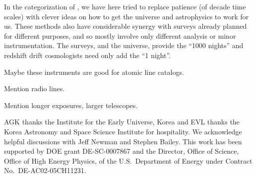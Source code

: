 \documentclass[preprint2, 10pt]{aastex}
\begin{document}
In the categorization of \citet{stebbins}, we have here tried to replace 
patience (of decade time scales) with clever ideas on how to get the 
universe and astrophysics to work for us.  These methods also have 
considerable synergy with surveys already planned for different purposes, 
and so mostly involve only different analysis or minor instrumentation. 
The surveys, and the universe, provide the ``1000 nights'' and redshift 
drift cosmologists need only add the ``1 night''. 

Maybe these instruments are good for atomic line catalogs.

Mention radio lines. 

Mention longer exposures, larger telescopes. 


\acknowledgments 

AGK thanks the Institute for the Early Universe, Korea and EVL thanks the 
Korea Astronomy and Space Science Institute for hospitality. 
We acknowledge helpful discussions with Jeff Newman and Stephen Bailey.  
This work has been supported by DOE grant DE-SC-0007867 and the Director, 
Office of Science, Office of High Energy Physics, 
of the U.S.\ Department of Energy under Contract No.\ DE-AC02-05CH11231. 




\end{document}
